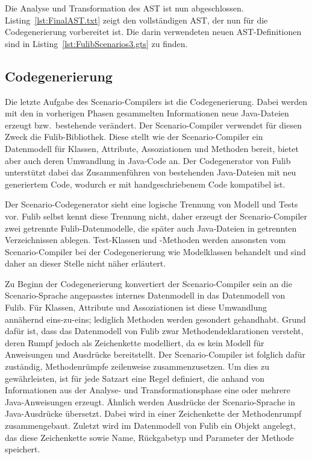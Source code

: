 Die Analyse und Transformation des AST ist nun abgeschlossen.
Listing~\ref{lst:FinalAST.txt} zeigt den vollständigen AST, der nun für die Codegenerierung vorbereitet ist.
Die darin verwendeten neuen AST-Definitionen sind in Listing~\ref{lst:FulibScenarios3.gts} zu finden.



\subsection{Codegenerierung}\label{subsec:codegen-fulib}

Die letzte Aufgabe des Scenario-Compilers ist die Codegenerierung.
Dabei werden mit den in vorherigen Phasen gesammelten Informationen neue Java-Dateien erzeugt bzw.\ bestehende verändert.
Der Scenario-Compiler verwendet für diesen Zweck die Fulib-Bibliothek\cite{fulib}.
Diese stellt wie der Scenario-Compiler ein Datenmodell für Klassen, Attribute, Assoziationen und Methoden bereit, bietet aber auch deren Umwandlung in Java-Code an.
Der Codegenerator von Fulib unterstützt dabei das Zusammenführen von bestehenden Java-Dateien mit neu generiertem Code, wodurch er mit handgeschriebenem Code kompatibel ist.

Der Scenario-Codegenerator sieht eine logische Trennung von Modell und Tests vor.
Fulib selbst kennt diese Trennung nicht, daher erzeugt der Scenario-Compiler zwei getrennte Fulib-Datenmodelle, die später auch Java-Dateien in getrennten Verzeichnissen ablegen.
Test-Klassen und -Methoden werden ansonsten vom Scenario-Compiler bei der Codegenerierung wie Modelklassen behandelt und sind daher an dieser Stelle nicht näher erläutert.

Zu Beginn der Codegenerierung konvertiert der Scenario-Compiler sein an die Scenario-Sprache angepasstes internes Datenmodell in das Datenmodell von Fulib.
Für Klassen, Attribute und Assoziationen ist diese Umwandlung annähernd eins-zu-eins;
lediglich Methoden werden gesondert gehandhabt.
Grund dafür ist, dass das Datenmodell von Fulib zwar Methodendeklarationen versteht, deren Rumpf jedoch als Zeichenkette modelliert, da es kein Modell für Anweisungen und Ausdrücke bereitstellt.
Der Scenario-Compiler ist folglich dafür zuständig, Methodenrümpfe zeilenweise zusammenzusetzen.
Um dies zu gewährleisten, ist für jede Satzart eine Regel definiert, die anhand von Informationen aus der Analyse- und Transformationsphase eine oder mehrere Java-Anweisungen erzeugt.
Ähnlich werden Ausdrücke der Scenario-Sprache in Java-Ausdrücke übersetzt.
Dabei wird in einer Zeichenkette der Methodenrumpf zusammengebaut.
Zuletzt wird im Datenmodell von Fulib ein Objekt angelegt, das diese Zeichenkette sowie Name, Rückgabetyp und Parameter der Methode speichert.

